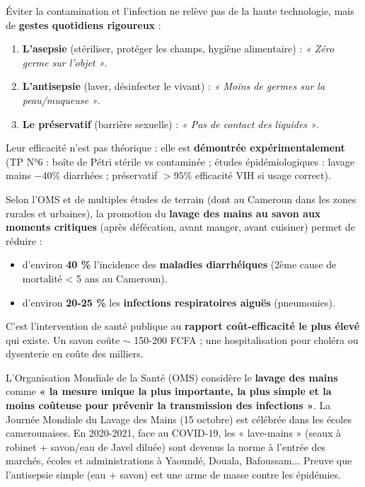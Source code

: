\documentclass[11pt]{article}
\newcounter{popsec}
\newcounter{popsub}
\newcommand{\courssub}[1]{%
  \stepcounter{popsub}%
  \par\vspace{9pt}\noindent{\popxbold\fontsize{11.5}{13}\selectfont\color{popink}{\color{poporange}\thepopsec.\thepopsub}\hspace{6pt}#1}\par\nopagebreak\vspace{4pt}
}
\begin{document}
\courssub{Bilan de la leçon et ouverture}

\begin{aretenir}
Éviter la contamination et l'infection ne relève pas de la haute technologie, mais de \textbf{gestes quotidiens rigoureux} :
\begin{enumerate}
    \item \textbf{L'asepsie} (stériliser, protéger les champs, hygiène alimentaire) : \emph{« Zéro germe sur l'objet »}.
    \item \textbf{L'antisepsie} (laver, désinfecter le vivant) : \emph{« Moins de germes sur la peau/muqueuse »}.
    \item \textbf{Le préservatif} (barrière sexuelle) : \emph{« Pas de contact des liquides »}.
\end{enumerate}
Leur efficacité n'est pas théorique : elle est \textbf{démontrée expérimentalement} (TP N°6 : boîte de Pétri stérile vs contaminée ; études épidémiologiques : lavage mains $-40\%$ diarrhées ; préservatif $>95\%$ efficacité VIH si usage correct).
\end{aretenir}

\begin{exemplebox}
Selon l'OMS et de multiples études de terrain (dont au Cameroun dans les zones rurales et urbaines), la promotion du \textbf{lavage des mains au savon aux moments critiques} (après défécation, avant manger, avant cuisiner) permet de réduire :
\begin{itemize}
    \item d'environ \textbf{40 \%} l'incidence des \textbf{maladies diarrhéiques} (2ème cause de mortalité < 5 ans au Cameroun).
    \item d'environ \textbf{20-25 \%} les \textbf{infections respiratoires aiguës} (pneumonies).
\end{itemize}
C'est l'intervention de santé publique au \textbf{rapport coût-efficacité le plus élevé} qui existe. Un savon coûte $\sim$ 150-200 FCFA ; une hospitalisation pour choléra ou dysenterie en coûte des milliers.
\end{exemplebox}

\begin{savaistu}
L'Organisation Mondiale de la Santé (OMS) considère le \textbf{lavage des mains} comme \textbf{« la mesure unique la plus importante, la plus simple et la moins coûteuse pour prévenir la transmission des infections »}. La Journée Mondiale du Lavage des Mains (15 octobre) est célébrée dans les écoles camerounaises. En 2020-2021, face au COVID-19, les « lave-mains » (seaux à robinet + savon/eau de Javel diluée) sont devenus la norme à l'entrée des marchés, écoles et administrations à Yaoundé, Douala, Bafoussam... Preuve que l'antisepsie simple (eau + savon) est une arme de masse contre les épidémies.
\end{savaistu}
\end{document}
